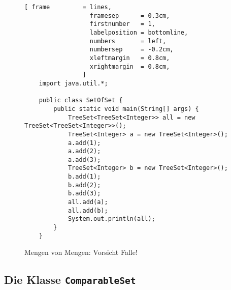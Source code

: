 \begin{figure}[!ht]
\centering
\begin{Verbatim}[ frame         = lines, 
                  framesep      = 0.3cm, 
                  firstnumber   = 1,
                  labelposition = bottomline,
                  numbers       = left,
                  numbersep     = -0.2cm,
                  xleftmargin   = 0.8cm,
                  xrightmargin  = 0.8cm,
                ]
    import java.util.*;
    
    public class SetOfSet {
        public static void main(String[] args) {
            TreeSet<TreeSet<Integer>> all = new TreeSet<TreeSet<Integer>>();
            TreeSet<Integer> a = new TreeSet<Integer>();
            a.add(1);
            a.add(2);
            a.add(3);
            TreeSet<Integer> b = new TreeSet<Integer>();
            b.add(1);
            b.add(2);
            b.add(3);
            all.add(a);
            all.add(b);
            System.out.println(all);
        }
    }
\end{Verbatim}
\vspace*{-0.3cm}
\caption{Mengen von Mengen: Vorsicht Falle!}
\label{fig:SetOfSet.java}
\end{figure}
\pagebreak


\subsection{Die Klasse \texttt{ComparableSet}}

